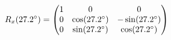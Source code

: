 \documentclass[preview]{standalone}
\begin{document}
\begin{align*}
\special{dvisvgm:raw <g id='unique000'>}R_x(27.2^\circ) = \begin{pmatrix} 1 & 0 & 0 \\ 0 & \cos(27.2^\circ) & -\sin(27.2^\circ) \\ 0 & \sin(27.2^\circ) & \cos(27.2^\circ) \end{pmatrix}\special{dvisvgm:raw </g>}
\end{align*}
\end{document}
